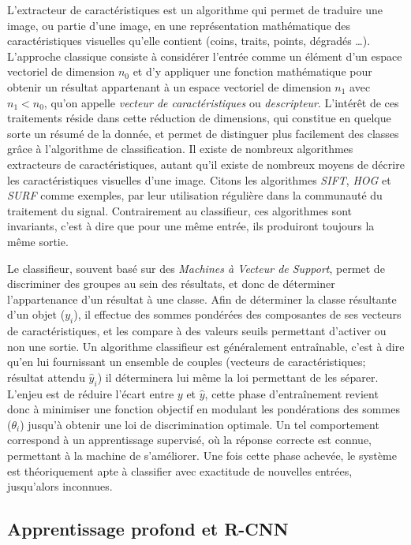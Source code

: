 			L'extracteur de caractéristiques est un algorithme qui permet de traduire une image, ou partie d'une image, en une représentation mathématique des caractéristiques visuelles qu'elle contient (coins, traits, points, dégradés \dots). L'approche classique consiste à considérer l'entrée comme un élément d'un espace vectoriel de dimension $n_{0}$ et d'y appliquer une fonction mathématique pour obtenir un résultat appartenant à un espace vectoriel de dimension $n_{1}$ avec $n_{1} < n_{0}$, qu'on appelle \emph{vecteur de caractéristiques} ou \emph{descripteur}. L'intérêt de ces traitements réside dans cette réduction de dimensions, qui constitue en quelque sorte un résumé de la donnée, et permet de distinguer plus facilement des classes grâce à l'algorithme de classification. Il existe de nombreux algorithmes extracteurs de caractéristiques, autant qu'il existe de nombreux moyens de décrire les caractéristiques visuelles d'une image. Citons les algorithmes \emph{SIFT}\cite{sift}, \emph{HOG} \cite{hog} et \emph{SURF}\cite{surf} comme exemples, par leur utilisation régulière dans la communauté du traitement du signal. Contrairement au classifieur, ces algorithmes sont invariants, c'est à dire que pour une même entrée, ils produiront toujours la même sortie.
			\par
			Le classifieur, souvent basé sur des \emph{Machines à Vecteur de Support}\cite{svm}, permet de discriminer des groupes au sein des résultats, et donc de déterminer l'appartenance d'un résultat à une classe. Afin de déterminer la classe résultante d'un objet ($y_{i}$), il effectue des sommes pondérées des composantes de ses vecteurs de caractéristiques, et les compare à des valeurs seuils permettant d'activer ou non une sortie. Un algorithme classifieur est généralement entraînable, c'est à dire qu'en lui fournissant un ensemble de couples (vecteurs de caractéristiques; résultat attendu $\hat{y}_{i}$) il déterminera lui même la loi permettant de les séparer. L'enjeu est de réduire l'écart entre $y$ et $\hat{y}$, cette phase d'entraînement revient donc à minimiser une fonction objectif en modulant les pondérations des sommes ($\theta_{i}$) jusqu'à obtenir une loi de discrimination optimale. Un tel comportement correspond à un apprentissage supervisé, où la réponse correcte est connue, permettant à la machine de s'améliorer. Une fois cette phase achevée, le système est théoriquement apte à classifier avec exactitude de nouvelles entrées, jusqu'alors inconnues.

		\subsection{Apprentissage profond et R-CNN}
		\label{sub:neural}
		
